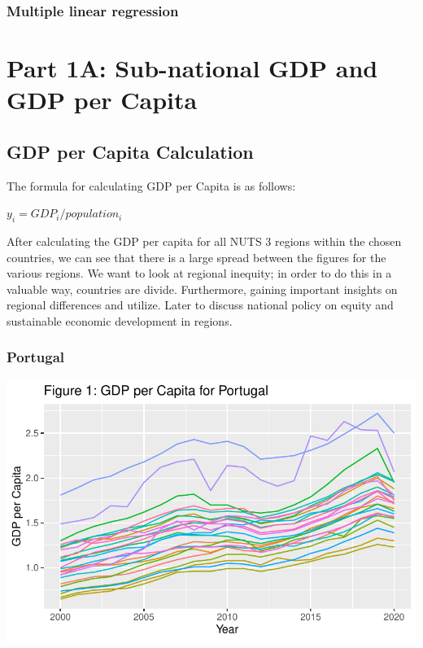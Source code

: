 \documentclass[
  a4paper,
  DIV=11,
  numbers=noendperiod]{scrartcl}
\begin{document}
\hypertarget{multiple-linear-regression}{%
\subsubsection{Multiple linear
regression}\label{multiple-linear-regression}}

\hypertarget{part-1a-sub-national-gdp-and-gdp-per-capita}{%
\section{Part 1A: Sub-national GDP and GDP per
Capita}\label{part-1a-sub-national-gdp-and-gdp-per-capita}}

\hypertarget{gdp-per-capita-calculation}{%
\subsection{GDP per Capita
Calculation}\label{gdp-per-capita-calculation}}

The formula for calculating GDP per Capita is as follows:

\(y_i=GDP_i/population_i\)

After calculating the GDP per capita for all NUTS 3 regions within the
chosen countries, we can see that there is a large spread between the
figures for the various regions. We want to look at regional inequity;
in order to do this in a valuable way, countries are divide.
Furthermore, gaining important insights on regional differences and
utilize. Later to discuss national policy on equity and sustainable
economic development in regions.

\hypertarget{portugal}{%
\subsubsection{Portugal}\label{portugal}}

\includegraphics{MSB104_GR_1_Final_Assignment_research_article_files/figure-pdf/unnamed-chunk-7-1.pdf}
\end{document}

